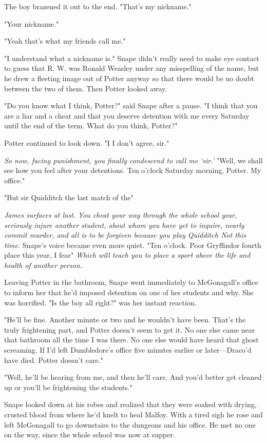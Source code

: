 The boy brazened it out to the end. "That's my nickname."

"Your nickname."

"Yeah{\el} that's what my friends call me."

"I understand what a nickname is." Snape didn't really need to make eye contact to guess that R. W. was Ronald Weasley under any misspelling of the name, but he drew a fleeting image out of Potter anyway so that there would be no doubt between the two of them. Then Potter looked away.

"Do you know what I think, Potter?" said Snape after a pause. "I think that you are a liar and a cheat and that you deserve detention with me every Saturday until the end of the term. What do you think, Potter?"

Potter continued to look down. "I{\el} I don't agree, sir."

\emph{So now, facing punishment, you finally condescend to call me `sir.'} "Well, we shall see how you feel after your detentions. Ten o'clock Saturday morning, Potter. My office."

"But sir{\el} Quidditch{\el} the last match of the{\el}"

\emph{James surfaces at last. You cheat your way through the whole school year, seriously injure another student, about whom you have yet to inquire, nearly commit murder, and all is to be forgiven because you play Quidditch{\el} Not this time.} Snape's voice became even more quiet. "Ten o'clock. Poor Gryffindor{\el} fourth place this year, I fear{\el}" \emph{Which will teach you to place a sport above the life and health of another person.}

Leaving Potter in the bathroom, Snape went immediately to McGonagall's office to inform her that he'd imposed detention on one of her students and why. She was horrified. "Is the boy all right?" was her instant reaction.

"He'll be fine. Another minute or two and he wouldn't have been. That's the truly frightening part, and Potter doesn't seem to get it. No one else came near that bathroom all the time I was there. No one else would have heard that ghost screaming. If I'd left Dumbledore's office five minutes earlier or later—Draco'd have died. Potter doesn't care."

"Well, he'll be hearing from me, and then he'll care. And you'd better get cleaned up or you'll be frightening the students."

Snape looked down at his robes and realized that they were soaked with drying, crusted blood from where he'd knelt to heal Malfoy. With a tired sigh he rose and left McGonagall to go downstairs to the dungeons and his office. He met no one on the way, since the whole school was now at supper.

